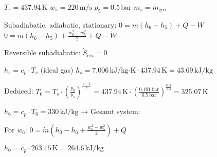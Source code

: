\( T_s = 437.94 \, \text{K} \)  
\( w_5 = 220 \, \text{m/s} \)  
\( p_5 = 0.5 \, \text{bar} \)  
\( m_s = \dot{m}_{\text{geo}} \)  

Subadiabatic, adiabatic, stationary:  
\( 0 = \dot{m} (h_6 - h_5) + Q - W \)  
\( 0 = m (h_6 - h_5) + \frac{w_6^2 - w_5^2}{2} + Q - \dot{W} \)  

Reversible subadiabatic:  
\( \dot{S}_{\text{erz}} = 0 \)  

\( h_s = c_p \cdot T_s \) (ideal gas)  
\( h_s = 7.006 \, \text{kJ/kg·K} \cdot 437.94 \, \text{K} = 43.69 \, \text{kJ/kg} \)  

Deduced:  
\( T_6 = T_s \cdot \left( \frac{p_6}{p_5} \right)^{\frac{\kappa - 1}{\kappa}} = 437.94 \, \text{K} \cdot \left( \frac{0.191 \, \text{bar}}{0.5 \, \text{bar}} \right)^{\frac{0.4}{1.4}} = 325.07 \, \text{K} \)  

\( h_6 = c_p \cdot T_6 = 330 \, \text{kJ/kg} \) → Gesamt system:  

For \( w_6 \):  
\( 0 = \dot{m} \left( h_0 - h_6 + \frac{w_6^2 - w_5^2}{2} \right) + Q \)  

\( h_0 = c_p \cdot 263.15 \, \text{K} = 264.6 \, \text{kJ/kg} \)